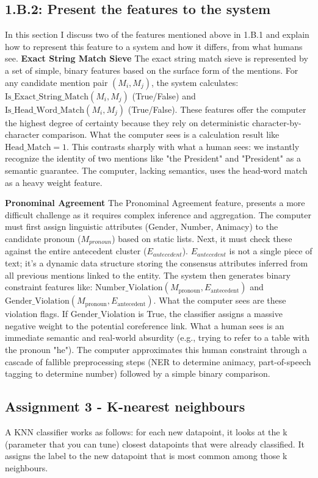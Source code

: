 \documentclass[11pt]{article}
\begin{document}
\subsection*{1.B.2: Present the features to the system}
In this section I discuss two of the features mentioned above in 1.B.1 and explain how to represent this feature to a system and how it differs, from what humans see.
\textbf{Exact String Match Sieve}
The exact string match sieve is represented by a set of simple, binary features based on the surface form of the mentions.
For any candidate mention pair $(M_i, M_j)$, the system calculates: $\mathrm{Is\_Exact\_String\_Match}(M_i, M_j)$ (True/False) and $\mathrm{Is\_Head\_Word\_Match}(M_i, M_j)$ (True/False).
These features offer the computer the highest degree of certainty because they rely on deterministic character-by-character comparison.
What the computer sees is a calculation result like $\text{Head\_Match} = 1$.
This contrasts sharply with what a human sees: we instantly recognize the identity of two mentions like "the President" and "President" as a semantic guarantee.
The computer, lacking semantics, uses the head-word match as a heavy weight feature.

\textbf{Pronominal Agreement}
The Pronominal Agreement feature, presents a more difficult challenge as it requires complex inference and aggregation.
The computer must first assign linguistic attributes (Gender, Number, Animacy) to the candidate pronoun ($M_{pronoun}$) based on static lists.
Next, it must check these against the entire antecedent cluster ($E_{antecedent}$). $E_{antecedent}$ is not a single piece of text; it's a dynamic data structure storing the consensus attributes inferred from all previous mentions linked to the entity.
The system then generates binary constraint features like: $\mathrm{Number\_Violation}(M_{\text{pronoun}}, E_{\text{antecedent}})$ and $\mathrm{Gender\_Violation}(M_{\text{pronoun}}, E_{\text{antecedent}})$.
What the computer sees are these violation flags. If $\mathrm{Gender\_Violation}$ is True, the classifier assigns a massive negative weight to the potential coreference link.
What a human sees is an immediate semantic and real-world absurdity (e.g., trying to refer to a table with the pronoun "he").
The computer approximates this human constraint through a cascade of fallible preprocessing steps (NER to determine animacy, part-of-speech tagging to determine number) followed by a simple binary comparison.

\subsection*{Assignment 3 - K-nearest neighbours}
A KNN classifier works as follows:
for each new datapoint, it looks at the k (parameter that you can tune) closest datapoints that were already classified.
It assigns the label to the new datapoint that is most common among those k neighbours.
\end{document}
